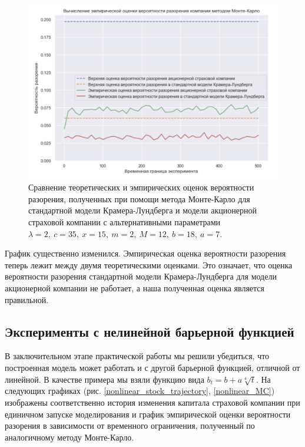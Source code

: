 \documentclass{article}
\theoremstyle{plain}
\theoremstyle{plain}
\theoremstyle{plain}
\theoremstyle{plain}
\theoremstyle{definition}
\theoremstyle{remark}
\begin{document}
\begin{figure}[h]
\centering
\includegraphics[scale=0.7]{images/KL_stock_MC_2.png}
\captionsetup{justification=centering}
\caption{Сравнение теоретических и эмпирических оценок вероятности разорения, полученных при помощи метода Монте-Карло для стандартной модели Крамера-Лундберга и модели акционерной страховой компании с альтернативными параметрами $\lambda = 2,\ c = 35,\ x = 15,\ m = 2,\ M = 12,\ b = 18,\ a = 7$.}
\label{MC_2}
\end{figure}

График существенно изменился. Эмпирическая оценка вероятности разорения теперь лежит между двумя теоретическими оценками. Это означает, что оценка вероятности разорения стандартной модели Крамера-Лундберга для модели акционерной компании не работает, а наша полученная оценка является правильной.

\subsection{Эксперименты с нелинейной барьерной функцией}

В заключительном этапе практической работы мы решили убедиться, что построенная модель может работать и с другой барьерной функцией, отличной от линейной. В качестве примера мы взяли функцию вида $b_t = b + a \sqrt[4]{t}$. На следующих графиках (рис. \ref{nonlinear_stock_trajectory}, \ref{nonlinear_MC}) изображены соответственно история изменения капитала страховой компании при единичном запуске моделирования и график эмпирической оценки вероятности разорения в зависимости от временного ограничения, полученный по аналогичному методу Монте-Карло.
\end{document}
